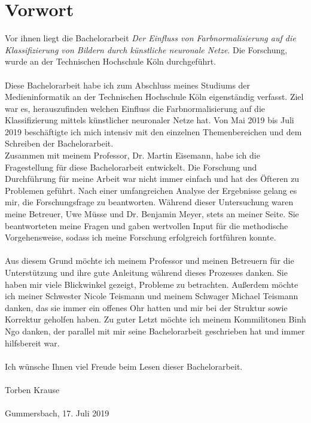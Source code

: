 \chapter*{Vorwort}
Vor ihnen liegt die Bachelorarbeit \textit{Der Einfluss von Farbnormalisierung auf die Klassifizierung von Bildern durch künstliche neuronale Netze}. Die Forschung, wurde an der Technischen Hochschule Köln durchgeführt.\\\\
Diese Bachelorarbeit habe ich zum Abschluss meines Studiums der Medieninformatik an der Technischen Hochschule Köln eigenständig verfasst. Ziel war es, herauszufinden welchen Einfluss die Farbnormalisierung auf die Klassifizierung mittels künstlicher neuronaler Netze hat. Von Mai 2019 bis Juli 2019 beschäftigte ich mich intensiv mit den einzelnen Themenbereichen und dem Schreiben der Bachelorarbeit.\\
Zusammen mit meinem Professor, Dr. Martin Eisemann, habe ich die Fragestellung für diese Bachelorarbeit entwickelt. Die Forschung und Durchführung für meine Arbeit war nicht immer einfach und hat des Öfteren zu Problemen geführt. Nach einer umfangreichen Analyse der Ergebnisse gelang es mir, die Forschungsfrage zu beantworten. Während dieser Untersuchung waren meine Betreuer, Uwe Müsse und Dr. Benjamin Meyer, stets an meiner Seite. Sie beantworteten meine Fragen und gaben wertvollen Input für die methodische Vorgehensweise, sodass ich meine Forschung erfolgreich fortführen konnte.\\\\
Aus diesem Grund möchte ich meinem Professor und meinen Betreuern für die Unterstützung und ihre gute Anleitung während dieses Prozesses danken. Sie haben mir viele Blickwinkel gezeigt, Probleme zu betrachten. Außerdem möchte ich meiner Schwester Nicole Teismann und meinem Schwager Michael Teismann danken, das sie immer ein offenes Ohr hatten und mir bei der Struktur sowie Korrektur geholfen haben. Zu guter Letzt möchte ich meinem Kommilitonen Binh Ngo danken, der parallel mit mir seine Bachelorarbeit geschrieben hat und immer hilfsbereit war.\\\\
Ich wünsche Ihnen viel Freude beim Lesen dieser Bachelorarbeit.\\\\
Torben Krause\\\\
Gummersbach, 17. Juli 2019